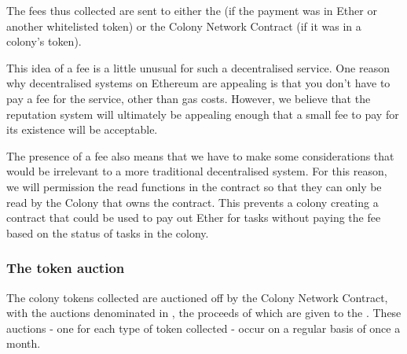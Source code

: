 \begin{center}
\end{center}

The fees thus collected are sent to either the \rc (if the payment was in Ether or another whitelisted token) or the Colony Network Contract (if it was in a colony's token).


This idea of a fee is a little unusual for such a decentralised service. One reason why decentralised systems on Ethereum are appealing is that you don't have to pay a fee for the service, other than gas costs. However, we believe that the reputation system will ultimately be appealing enough that a small fee to pay for its existence will be acceptable.

The presence of a fee also means that we have to make some considerations that would be irrelevant to a more traditional decentralised system. For this reason, we will permission the read functions in the  contract so that they can only be read by the Colony that owns the  contract. This prevents a colony creating a contract that could be used to pay out Ether for tasks without paying the fee based on the status of tasks in the colony.

\subsubsection{The token auction}
The colony tokens collected are auctioned off by the Colony Network Contract, with the auctions denominated in \rcts, the proceeds of which are given to the \rc. These auctions - one for each type of token collected - occur on a regular basis of once a month.

